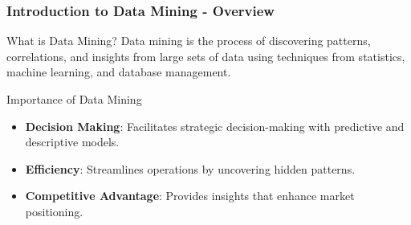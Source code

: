 \documentclass[aspectratio=169]{beamer}
\begin{document}
\frame{\titlepage}

\begin{frame}[fragile]
    \frametitle{Introduction to Data Mining - Overview}
    \begin{block}{What is Data Mining?}
        Data mining is the process of discovering patterns, correlations, and insights from large sets of data using techniques from statistics, machine learning, and database management.
    \end{block}
    \begin{block}{Importance of Data Mining}
        \begin{itemize}
            \item \textbf{Decision Making}: Facilitates strategic decision-making with predictive and descriptive models.
            \item \textbf{Efficiency}: Streamlines operations by uncovering hidden patterns.
            \item \textbf{Competitive Advantage}: Provides insights that enhance market positioning.
        \end{itemize}
    \end{block}
\end{frame}
\end{document}
